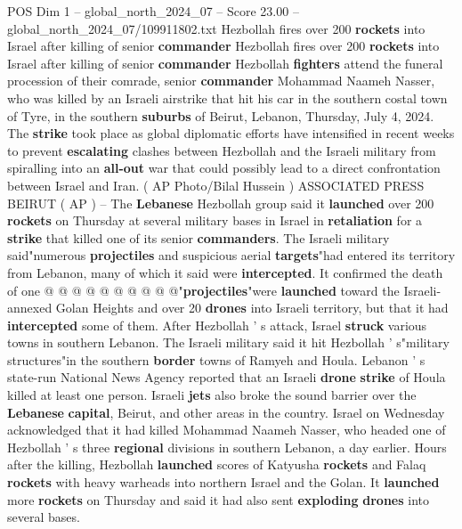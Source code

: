 \begin{textsample}{POS Dim 1 – global\_north\_2024\_07 – Score 23.00 – global\_north\_2024\_07/109911802.txt}  \label{ex:f1_pos_188}
Hezbollah fires over 200 \textbf{rockets} into Israel after killing of senior \textbf{commander} Hezbollah fires over 200 \textbf{rockets} into Israel after killing of senior \textbf{commander} Hezbollah \textbf{fighters} attend the funeral procession of their comrade, senior \textbf{commander} Mohammad Naameh Nasser, who was killed by an Israeli airstrike that hit his car in the southern costal town of Tyre, in the southern \textbf{suburbs} of Beirut, Lebanon, Thursday, July 4, 2024.
The \textbf{strike} took place as global diplomatic efforts have intensified in recent weeks to prevent \textbf{escalating} clashes between Hezbollah and the Israeli military from spiralling into an \textbf{all-out} war that could possibly lead to a direct confrontation between Israel and Iran. ( AP Photo/Bilal Hussein ) ASSOCIATED PRESS BEIRUT ( AP ) -- The \textbf{Lebanese} Hezbollah group said it \textbf{launched} over 200 \textbf{rockets} on Thursday at several military bases in Israel in \textbf{retaliation} for a \textbf{strike} that killed one of its senior \textbf{commanders}.
The Israeli military said"numerous \textbf{projectiles} and suspicious aerial \textbf{targets}"had entered its territory from Lebanon, many of which it said were \textbf{intercepted}.
It confirmed the death of one @ @ @ @ @ @ @ @ @ @"\textbf{projectiles}"were \textbf{launched} toward the Israeli-annexed Golan Heights and over 20 \textbf{drones} into Israeli territory, but that it had \textbf{intercepted} some of them.
After Hezbollah ' s attack, Israel \textbf{struck} various towns in southern Lebanon.
The Israeli military said it hit Hezbollah ' s"military structures"in the southern \textbf{border} towns of Ramyeh and Houla.
Lebanon ' s state-run National News Agency reported that an Israeli \textbf{drone} \textbf{strike} of Houla killed at least one person.
Israeli \textbf{jets} also broke the sound barrier over the \textbf{Lebanese} \textbf{capital}, Beirut, and other areas in the country.
Israel on Wednesday acknowledged that it had killed Mohammad Naameh Nasser, who headed one of Hezbollah ' s three \textbf{regional} divisions in southern Lebanon, a day earlier.
Hours after the killing, Hezbollah \textbf{launched} scores of Katyusha \textbf{rockets} and Falaq \textbf{rockets} with heavy warheads into northern Israel and the Golan.
It \textbf{launched} more \textbf{rockets} on Thursday and said it had also sent \textbf{exploding} \textbf{drones} into several bases.

\end{textsample}
